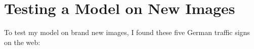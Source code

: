 \documentclass[12pt]{article}
\begin{document}
\section{Testing a Model on New Images}
To test my model on brand new images, I found these five German traffic signs on the web:
\begin{figure}[H]
\centering
{}
\end{figure}
\end{document}
